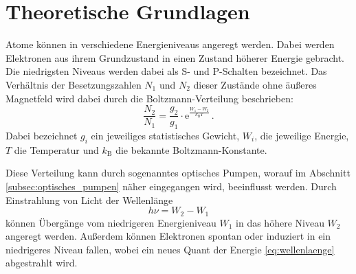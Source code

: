 \section{Theoretische Grundlagen}
\label{sec:theoretische_grundlagen}
Atome können in verschiedene Energieniveaus angeregt werden. Dabei werden
Elektronen aus ihrem Grundzustand in einen Zustand höherer Energie gebracht.
Die niedrigsten Niveaus werden dabei als S- und P-Schalten bezeichnet.  Das
Verhältnis der Besetzungszahlen $N_1$ und $N_2$ dieser Zustände ohne äußeres
Magnetfeld wird dabei durch die Boltzmann-Verteilung beschrieben:
\begin{equation}
\label{eq:boltzmann}
    \frac{N_2}{N_1} = \frac{g_2}{g_1}\cdot
        \mathrm{e}^\frac{W_1 - W_2}{k_\text{B}T}\,.
\end{equation}
Dabei bezeichnet $g_i$ ein jeweiliges statistisches Gewicht, $W_i$, die
jeweilige Energie, $T$ die Temperatur und $k_\text{B}$ die bekannte
Boltzmann-Konstante.

Diese Verteilung kann durch sogenanntes optisches Pumpen, worauf im Abschnitt
\ref{subsec:optisches_pumpen} näher eingegangen wird, beeinflusst werden.
Durch Einstrahlung von Licht der Wellenlänge
\begin{equation}
\label{eq:wellenlaenge}
    h\nu = W_2 - W_1
\end{equation}
können Übergänge vom niedrigeren Energieniveau $W_1$ in das höhere Niveau
$W_2$ angeregt werden. Außerdem können Elektronen spontan oder induziert in ein
niedrigeres Niveau fallen, wobei ein neues Quant der Energie
\ref{eq:wellenlaenge} abgestrahlt wird.

